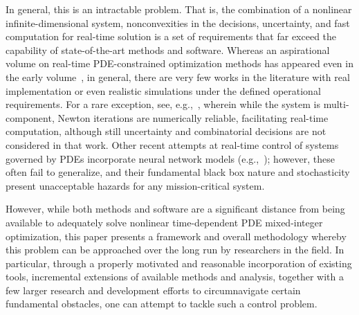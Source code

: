\documentclass{article}
\newcommand{\1}{\mathds{1}}          %
\theoremstyle{definition}
\begin{document}
\begin{sloppypar}
In general, this is an intractable problem. That is, the combination of a nonlinear infinite-dimensional system, nonconvexities in the decisions, uncertainty, and fast computation for real-time solution is a set of requirements that far exceed the capability of state-of-the-art methods and software. Whereas an aspirational volume on real-time PDE-constrained optimization methods has appeared even in the early volume~\cite{biegler2007real}, in general, there are very few works in the literature with real implementation or even realistic simulations under the defined operational requirements. For a rare exception, see, e.g.,~\cite{behrens2014real}, wherein while the system is multi-component, Newton iterations are numerically reliable, facilitating real-time computation, although still uncertainty and combinatorial decisions are not considered in that work. Other recent attempts at real-time control of systems governed by PDEs incorporate neural network models (e.g.,~\cite{wang2021fast}); however, these often fail to generalize, and their fundamental black box nature and stochasticity present unacceptable hazards for any mission-critical system. 

However, while both methods and software are a significant distance from being available to adequately solve nonlinear time-dependent PDE mixed-integer optimization, this paper presents a framework and overall methodology whereby this problem can be approached over the long run by researchers in the field. In particular, through a properly motivated and reasonable incorporation of existing tools, incremental extensions of available methods and analysis, together with a few larger research and development efforts to circumnavigate certain fundamental obstacles, one can attempt to tackle such a control problem. 


\end{sloppypar}
\end{document}

